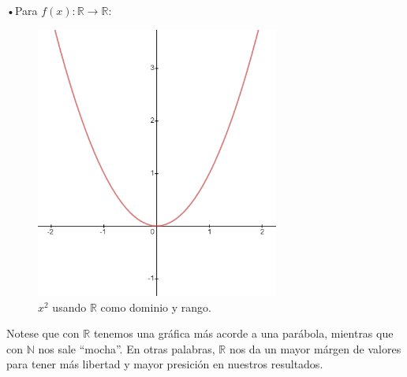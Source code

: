 \documentclass[letterpaper, 12pt]{article}
\begin{document}
        •Para \(f(x):\mathbb{R}\rightarrow\mathbb{R}\):
        \begin{figure}[H]
            \centering
            \includegraphics[width=8cm]{fxr.png}
            \caption{\(x^2\) usando \(\mathbb{R}\) como dominio y rango.}
        \end{figure}
        Notese que con \(\mathbb{R}\) tenemos una gráfica más acorde a una parábola, mientras que con \(\mathbb{N}\) nos sale ``mocha''. En otras palabras, \(\mathbb{R}\) nos da un mayor márgen de valores para tener más libertad y mayor presición en nuestros resultados.
\end{document}

